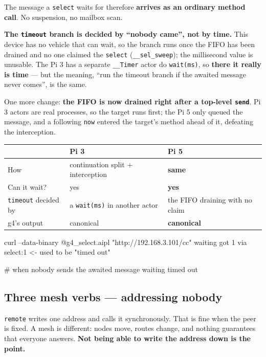 \documentclass[11pt,a4paper]{article}
\begin{document}
The message a \texttt{select} waits for therefore \textbf{arrives as an ordinary
method call}. No suspension, no mailbox scan.

\textbf{The \texttt{timeout} branch is decided by ``nobody came'', not by time.}
This device has no vehicle that can wait, so the branch runs once the FIFO has
been drained and no one claimed the \texttt{select} (\texttt{\_\_sel\_sweep});
the millisecond value is unusable. The Pi 3 has a separate \texttt{\_\_Timer}
actor do \texttt{wait(ms)}, so \textbf{there it really is time} --- but the
meaning, ``run the timeout branch if the awaited message never comes'', is the same.

One more change: \textbf{the FIFO is now drained right after a top-level
\texttt{send}}. Pi 3 actors are real processes, so the target runs first; the
Pi 5 only queued the message, and a following \texttt{now} entered the target's
method ahead of it, defeating the interception.

\begin{center}
\small
\begin{tabular}{@{}lll@{}}
\toprule
 & Pi 3 & Pi 5 \\
\midrule
How & continuation split + interception & \textbf{same} \\
Can it wait? & yes & \textbf{yes} \\
\texttt{timeout} decided by & a \texttt{wait(ms)} in another actor & the FIFO draining with no claim \\
g4's output & canonical & \textbf{canonical} \\
\bottomrule
\end{tabular}
\end{center}

\begin{term}
curl --data-binary @g4_select.aipl "http://192.168.3.101/cc"
waiting
got 1
via select:1            <- used to be "timed out"

# when nobody sends the awaited message
waiting
timed out
\end{term}

\subsection{Three mesh verbs --- addressing nobody}
\label{sec:xinu-mesh}

\texttt{remote} writes one address and calls it synchronously. That is fine when
the peer is fixed. A mesh is different: nodes move, routes change, and nothing
guarantees that everyone answers. \textbf{Not being able to write the address
down is the point.}
\end{document}
